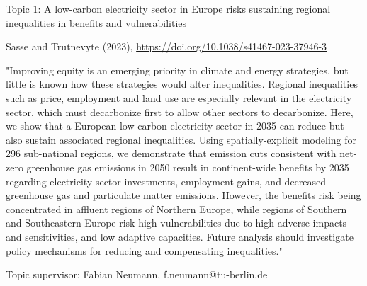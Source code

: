 \documentclass[10pt,aspectratio=169,dvipsnames]{beamer}
\begin{document}
\begin{frame}
  \begin{block}{Topic 1: A low-carbon electricity sector in Europe risks sustaining regional inequalities in benefits and vulnerabilities}
      
    Sasse and Trutnevyte (2023), \href{https://doi.org/10.1038/s41467-023-37946-3}{https://doi.org/10.1038/s41467-023-37946-3}
    
    "Improving equity is an emerging priority in climate and energy strategies, but little is known how these strategies would alter inequalities. Regional inequalities such as price, employment and land use are especially relevant in the electricity sector, which must decarbonize first to allow other sectors to decarbonize. Here, we show that a European low-carbon electricity sector in 2035 can reduce but also sustain associated regional inequalities. Using spatially-explicit modeling for 296 sub-national regions, we demonstrate that emission cuts consistent with net-zero greenhouse gas emissions in 2050 result in continent-wide benefits by 2035 regarding electricity sector investments, employment gains, and decreased greenhouse gas and particulate matter emissions. However, the benefits risk being concentrated in affluent regions of Northern Europe, while regions of Southern and Southeastern Europe risk high vulnerabilities due to high adverse impacts and sensitivities, and low adaptive capacities. Future analysis should investigate policy mechanisms for reducing and compensating inequalities." 

    \hfill
    Topic supervisor: Fabian Neumann, f.neumann@tu-berlin.de
    
  \end{block}
\end{frame}
\end{document}
